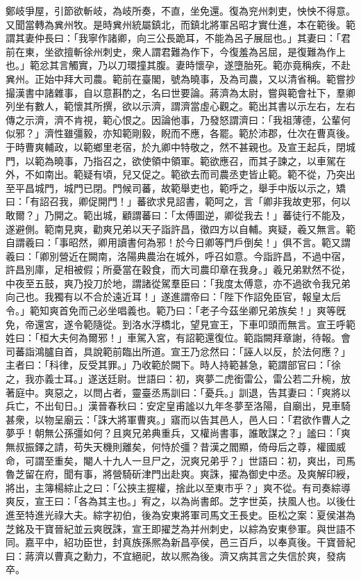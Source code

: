 \begin{pinyinscope}
鄭岐爭屋，引節欲斬岐，為岐所奏，不直，坐免還。復為兖州刺吏，怏怏不得意。又聞當轉為兾州牧。是時兾州統屬鎮北，而鎮北將軍呂昭才實仕進，本在範後。範謂其妻仲長曰：「我寧作諸卿，向三公長跪耳，不能為呂子展屈也。」其妻曰：「君前在東，坐欲擅斬徐州刺史，衆人謂君難為作下，今復羞為呂屈，是復難為作上也。」範忿其言觸實，乃以刀環撞其腹。妻時懷孕，遂墮胎死。範亦竟稱疾，不赴兾州。正始中拜大司農。範前在臺閣，號為曉事，及為司農，又以清省稱。範嘗抄撮漢書中諸雜事，自以意斟酌之，名曰世要論。蔣濟為太尉，嘗與範會社下，羣卿列坐有數人，範懷其所撰，欲以示濟，謂濟當虛心觀之。範出其書以示左右，左右傳之示濟，濟不肯視，範心恨之。因論他事，乃發怒謂濟曰：「我祖薄德，公輩何似邪？」濟性雖彊毅，亦知範剛毅，睨而不應，各罷。範於沛郡，仕次在曹真後。于時曹爽輔政，以範鄉里老宿，於九卿中特敬之，然不甚親也。及宣王起兵，閉城門，以範為曉事，乃指召之，欲使領中領軍。範欲應召，而其子諫之，以車駕在外，不如南出。範疑有頃，兒又促之。範欲去而司農丞吏皆止範。範不從，乃突出至平昌城門，城門已閉。門候司蕃，故範舉吏也，範呼之，舉手中版以示之，矯曰：「有詔召我，卿促開門！」蕃欲求見詔書，範呵之，言「卿非我故吏邪，何以敢爾？」乃開之。範出城，顧謂蕃曰：「太傅圖逆，卿從我去！」蕃徒行不能及，遂避側。範南見爽，勸爽兄弟以天子詣許昌，徵四方以自輔。爽疑，羲又無言。範自謂羲曰：「事昭然，卿用讀書何為邪！於今日卿等門戶倒矣！」俱不言。範又謂羲曰：「卿別營近在闕南，洛陽典農治在城外，呼召如意。今詣許昌，不過中宿，許昌別庫，足相被假；所憂當在穀食，而大司農印章在我身。」羲兄弟默然不從，中夜至五鼓，爽乃投刀於地，謂諸從駕羣臣曰：「我度太傅意，亦不過欲令我兄弟向己也。我獨有以不合於遠近耳！」遂進謂帝曰：「陛下作詔免臣官，報皇太后令。」範知爽首免而己必坐唱義也。範乃曰：「老子今茲坐卿兄弟族矣！」爽等旣免，帝還宮，遂令範隨從。到洛水浮橋北，望見宣王，下車叩頭而無言。宣王呼範姓曰：「桓大夫何為爾邪！」車駕入宮，有詔範還復位。範詣闕拜章謝，待報。會司蕃詣鴻臚自首，具說範前臨出所道。宣王乃忿然曰：「誣人以反，於法何應？」主者曰：「科律，反受其罪。」乃收範於闕下。時人持範甚急，範謂部官曰：「徐之，我亦義士耳。」遂送廷尉。世語曰：初，爽夢二虎銜雷公，雷公若二升椀，放著庭中。爽惡之，以問占者，靈臺丞馬訓曰：「憂兵。」訓退，告其妻曰：「爽將以兵亡，不出旬日。」漢晉春秋曰：安定皇甫謐以九年冬夢至洛陽，自廟出，見車騎甚衆，以物呈廟云：「誅大將軍曹爽。」寤而以告其邑人，邑人曰：「君欲作曹人之夢乎！朝無公孫彊如何？且爽兄弟典重兵，又權尚書事，誰敢謀之？」謐曰：「爽無叔振鐸之請，苟失天機則離矣，何恃於彊？昔漢之閻顯，倚母后之尊，權國威命，可謂至重矣，閹人十九人一旦尸之，況爽兄弟乎？」世語曰：初，爽出，司馬魯芝留在府，聞有事，將營騎斫津門出赴爽。爽誅，擢為御史中丞。及爽解印綬，將出，主簿楊綜止之曰：「公挾主握權，捨此以至東巿乎？」爽不從。有司奏綜導爽反，宣王曰：「各為其主也。」宥之，以為尚書郎。芝字世英，扶風人也。以後仕進至特進光祿大夫。綜字初伯，後為安東將軍司馬文王長史。臣松之案：夏侯湛為芝銘及干寶晉紀並云爽旣誅，宣王即擢芝為并州刺史，以綜為安東參軍。與世語不同。嘉平中，紹功臣世，封真族孫熈為新昌亭侯，邑三百戶，以奉真後。干寶晉紀曰：蔣濟以曹真之勳力，不宜絕祀，故以熈為後。濟又病其言之失信於爽，發病卒。


\end{pinyinscope}
